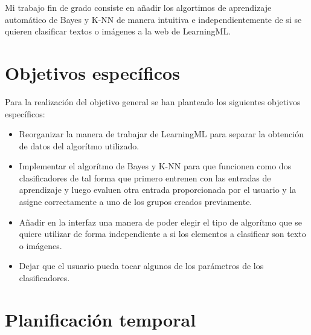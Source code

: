 \documentclass[a4paper, 12pt]{book}
\begin{document}
Mi trabajo fin de grado consiste en añadir los algortimos de aprendizaje automático de Bayes y K-NN de manera intuitiva e independientemente de si se quieren clasificar textos o imágenes a la web de LearningML.

\section{Objetivos específicos}
\label{sec:objetivos-especificos}

Para la realización del objetivo general se han planteado los siguientes objetivos específicos:
\begin{itemize}
  
	\item Reorganizar la manera de trabajar de LearningML para separar la obtención de datos del algorítmo utilizado.
 
	\item Implementar el algorítmo de Bayes y K-NN para que funcionen como dos clasificadores de tal forma que primero entrenen con las entradas de aprendizaje y luego evaluen otra entrada proporcionada por el usuario y la asigne correctamente a uno de los grupos creados previamente.
  
	\item Añadir en la interfaz una manera de poder elegir el tipo de algorítmo que se quiere utilizar de forma independiente a si los elementos a clasificar son texto o imágenes.

	\item Dejar que el usuario pueda tocar algunos de los parámetros de los clasificadores.

\end{itemize}


\section{Planificación temporal}
\label{sec:planificacion-temporal}
\end{document}
